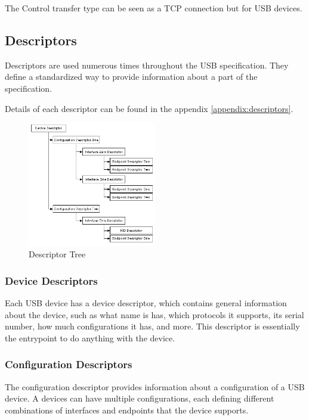 The Control transfer type can be seen as a TCP connection but for USB devices.

\subsection{Descriptors}

Descriptors are used numerous times throughout the USB specification. They define a standardized way to provide information about a part of the specification.

Details of each descriptor can be found in the appendix \ref{appendix:descriptors}.

\begin{figure}[h]
  \centering
  \includegraphics[width=0.5\textwidth]{images/descriptor_tree.png}
  \caption{Descriptor Tree}
  \label{fig:descriptor_tree}
\end{figure}

\subsubsection{Device Descriptors}

Each USB device has a device descriptor, which contains general information about the device, such as what name is has, which protocols it supports, its serial number, how much configurations it has, and more. This descriptor is essentially the entrypoint to do anything with the device.

\subsubsection{Configuration Descriptors}

The configuration descriptor provides information about a configuration of a USB device. A devices can have multiple configurations, each defining different combinations of interfaces and endpoints that the device supports.


